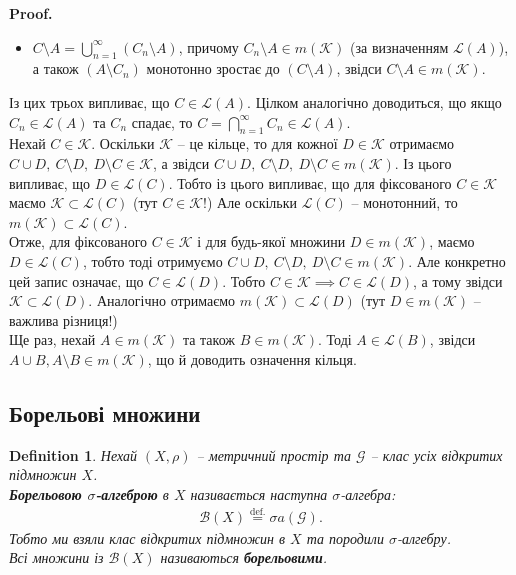 \documentclass[a4paper, 10pt]{article}
\makeatletter
\theoremstyle{theoremdd}
\newtheorem{definition}[theorem]{Definition}
\renewenvironment{proof}[1][Proof.\\]{\par
\pushQED{\hfill \qed}%
\normalfont \topsep6\p@\@plus6\p@\relax
\trivlist
\item\relax
{\bfseries
#1\@addpunct{.}}\hspace\labelsep\ignorespaces
}{%
\popQED\endtrivlist\@endpefalse
}
\makeatother
\begin{document}
\begin{proof}
\begin{itemize}[nosep,wide=0pt]
\item $C \setminus A = \displaystyle\bigcup_{n=1}^\infty (C_n \setminus A)$, причому $C_n \setminus A \in m(\mathcal{K})$ (за визначенням $\mathcal{L}(A)$), а також $(A \setminus C_n)$ монотонно зростає до $(C \setminus A)$, звідси $C \setminus A \in m(\mathcal{K})$.
\end{itemize}
Із цих трьох випливає, що $C \in \mathcal{L}(A)$. Цілком аналогічно доводиться, що якщо $C_n \in \mathcal{L}(A)$ та $C_n$ спадає, то $C = \displaystyle\bigcap_{n=1}^\infty C_n \in \mathcal{L}(A)$.
\bigskip \\
Нехай $C \in \mathcal{K}$. Оскільки $\mathcal{K}$ -- це кільце, то для кожної $D \in \mathcal{K}$ отримаємо $C \cup D,\ C \setminus D,\ D \setminus C \in \mathcal{K}$, а звідси $C \cup D,\ C \setminus D,\ D \setminus C \in m(\mathcal{K})$. Із цього випливає, що $D \in \mathcal{L}(C)$. Тобто із цього випливає, що для фіксованого $C \in \mathcal{K}$ маємо $\mathcal{K} \subset \mathcal{L}(C)$ (тут $C \in \mathcal{K}$!) Але оскільки $\mathcal{L}(C)$ -- монотонний, то $m (\mathcal{K}) \subset \mathcal{L}(C)$.\\
Отже, для фіксованого $C \in \mathcal{K}$ і для будь-якої множини $D \in m(\mathcal{K})$, маємо $D \in \mathcal{L}(C)$, тобто тоді отримуємо $C \cup D,\ C \setminus D,\ D \setminus C \in m(\mathcal{K})$. Але конкретно цей запис означає, що $C \in \mathcal{L}(D)$. Тобто $C \in \mathcal{K} \implies C \in \mathcal{L}(D)$, а тому звідси $\mathcal{K} \subset \mathcal{L}(D)$. Аналогічно отримаємо $m(\mathcal{K}) \subset \mathcal{L}(D)$ (тут $D \in m(\mathcal{K})$ -- важлива різниця!)
\bigskip \\
Ще раз, нехай $A \in m(\mathcal{K})$ та також $B \in m(\mathcal{K})$. Тоді $A \in \mathcal{L}(B)$, звідси $A \cup B, A \setminus B \in m(\mathcal{K})$, що й доводить означення кільця.
\end{proof}

\subsection{Борельові множини}
\begin{definition}
Нехай $(X,\rho)$ -- метричний простір та $\mathcal{G}$ -- клас усіх відкритих підмножин $X$.\\
\textbf{Борельовою $\sigma$-алгеброю} в $X$ називається наступна $\sigma$-алгебра:
\begin{align*}
\mathcal{B}(X) \overset{\text{def.}}{=} \sigma a(\mathcal{G}).
\end{align*}
Тобто ми взяли клас відкритих підмножин в $X$ та породили $\sigma$-алгебру.\\
Всі множини із $\mathcal{B}(X)$ називаються \textbf{борельовими}.
\end{definition}
\end{document}
